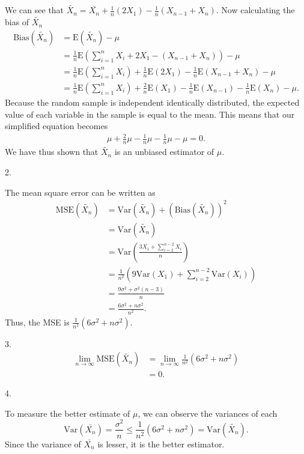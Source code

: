 \documentclass{article}
\begin{document}
We can see that $\tilde{X_n} = \bar{X_n} + \frac{1}{n}(2X_1)-\frac{1}{n}\left(X_{n-1}+X_n\right)$. Now calculating the bias of $\tilde{X_n}$
\begin{align*}
    \mbox{Bias}(\tilde{X_n}) &=\mbox{E}(\tilde{X_n}) - \mu\\
    &= \frac{1}{n}\mbox{E}\left(\sum_{i = 1}^{n}X_i + 2X_1 - (X_{n-1}+X_n)\right) - \mu\\
    &= \frac{1}{n}\mbox{E}\left(\sum_{i = 1}^{n}X_i\right)+\frac{1}{n}\mbox{E}(2X_1)-\frac{1}{n}\mbox{E}(X_{n-1}+X_n) - \mu\\
    &= \frac{1}{n}\mbox{E}\left(\sum_{i = 1}^{n}X_i\right)+\frac{2}{n}\mbox{E}(X_1)-\frac{1}{n}\mbox{E}(X_{n-1})-\frac{1}{n}\mbox{E}(X_n) - \mu\mbox{.}
\end{align*}
\hspace*{6mm}Because the random sample is independent identically distributed, the expected value of each variable in the sample is equal to the mean. This means that our simplified equation becomes
\begin{align*}
    \mu + \frac{2}{n}\mu -\frac{1}{n}\mu -\frac{1}{n}\mu -\mu = 0\mbox{.}
\end{align*}
We have thus shown that $\tilde{X_n}$ is an unbiased estimator of $\mu$.

2.

The mean square error can be written as
\begin{align*}
    \mbox{MSE}(\tilde{X_n}) &= \mbox{Var}(\tilde{X_n})+(\mbox{Bias}(\tilde{X_n}))^2\\
    &= \mbox{Var}(\tilde{X_n})\\
    &= \mbox{Var}\left(\frac{3X_1+\sum_{i = 2}^{n-2}X_i}{n}\right)\\
    &= \frac{1}{n^2}\left(9\mbox{Var}(X_1) + \sum_{i = 2}^{n-2}\mbox{Var}(X_i)\right)\\
    &= \frac{9\sigma^2 + \sigma^2(n - 3)}{n}\\
    &= \frac{6\sigma^2 + n\sigma^2}{n^2}\mbox{.}
\end{align*}
Thus, the MSE is $\frac{1}{n^2}(6\sigma^2 + n\sigma^2)$.

3.
\begin{align*}
    \lim_{n\rightarrow\infty}\mbox{MSE}(\tilde{X_n}) &= \lim_{n\rightarrow\infty}\frac{1}{n^2}(6\sigma^2 + n\sigma^2)\\
    &= 0\mbox{.}
\end{align*}

4.

To measure the better estimate of $\mu$, we can observe the variances of each
\begin{equation*}
    \mbox{Var}(\bar{X_n}) = \frac{\sigma^2}{n}\leq \frac{1}{n^2}(6\sigma^2 + n\sigma^2) = \mbox{Var}(\tilde{X_n})\mbox{.}
\end{equation*}
Since the variance of $\bar{X_n}$ is lesser, it is the better estimator.
\pagebreak
\end{document}
